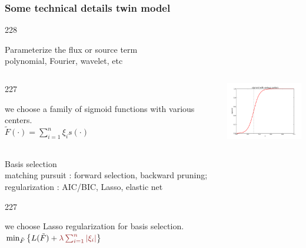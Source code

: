 \documentclass{beamer}
\let\oldcite=\cite
\renewcommand{\cite}[1]{\textcolor[rgb]{.4,.4,.85}{\oldcite{#1}}}
\newcommand{\barrow}{\item[\color{darkred}\ding{228}]}
\newcommand{\carrow}{\item[\color{darkred}\ding{227}]}
\begin{document}
\setcounter{framenumber}{9}

\begin{frame}
    \frametitle{Some technical details \hfill \scriptsize{twin model}}\small
    \begin{dinglist}{228}
        \barrow Parameterize the flux or source term \\\vspace{.05cm} \scriptsize polynomial, Fourier, wavelet, etc\\
        \small
        \vspace{-.3cm}
        \begin{columns}
            \begin{dinglist}{227}
                \carrow we choose a family of sigmoid functions with various centers.\\\scriptsize
                        $
                            \tilde{F}(\cdot) = \sum_{i=1}^n \xi_i s(\cdot)
                        $
            \end{dinglist}
            \small
            \includegraphics[width=3.5cm]{sigmoid_2.png}
        \end{columns}
        \barrow Basis selection\\\vspace{.05cm}
            \scriptsize matching pursuit \cite{Adler 96, Billing07}: forward selection, backward pruning;\\
            regularization \cite{Stone 77, Schwarz 78, Tibshirani 96}: AIC/BIC, Lasso, elastic net
            \small\vspace{.16cm}
            \begin{dinglist}{227}
                \carrow we choose Lasso regularization for basis selection.\scriptsize\\
                $
                    \min_{\tilde{F}} \left\{ L(\tilde{F})+\textcolor{darkred}{\lambda\sum_{i=1}^n\left| \xi_i \right|}\right\}
                $
            \end{dinglist}
    \end{dinglist}
\end{frame}
\end{document}
